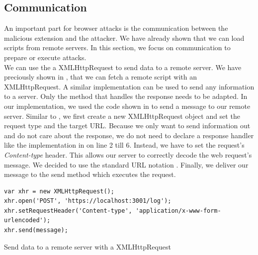 	\subsection{Communication}
	
		An important part for browser attacks is the communication between the malicious extension and the attacker. We have already shown that we can load scripts from remote servers. In this section, we focus on communication to prepare or execute attacks. \\ %
		
		We can use the a XMLHttpRequest to send data to a remote server. We have preciously shown in , that we can fetch a remote script with an XMLHttpRequest. A similar implementation can be used to send any information to a server. Only the method that handles the response needs to be adapted. In our implementation, we used the code shown in  to send a message to our remote server. Similar to , we first create a new XMLHttpRequest object and set the request type and the target URL. Because we only want to send information out and do not care about the response, we do not need to declare a response handler like the implementation in  on line 2 till 6. Instead, we have to set the request's \textit{Content-type} header. This allows our server to correctly decode the web request's message. We decided to use the standard URL notation \cite{w3cUrlSpecifications}. Finally, we deliver our message to the send method which executes the request. 
		
		\begin{code}
			\begin{lstlisting}
var xhr = new XMLHttpRequest();
xhr.open('POST', 'https://localhost:3001/log');
xhr.setRequestHeader('Content-type', 'application/x-www-form-urlencoded');
xhr.send(message);
			\end{lstlisting}
			\caption{Send data to a remote server with a XMLHttpRequest}
			\label{xhrSendData}
		\end{code}
		
